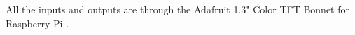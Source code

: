 All the inputs and outputs are through the Adafruit 1.3" Color TFT Bonnet for Raspberry Pi \cite{adafruitwebsite}.